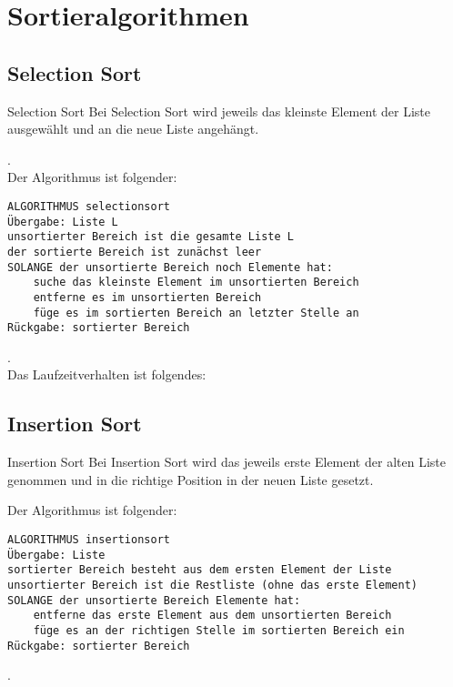 \section{Sortieralgorithmen}
\subsection{Selection Sort}
\begin{zitat}{Selection Sort}
Bei Selection Sort wird jeweils das kleinste Element der Liste ausgewählt und an die neue Liste angehängt.
\end{zitat}
.\\
Der Algorithmus ist folgender:
\begin{lstlisting}
ALGORITHMUS selectionsort
Übergabe: Liste L
unsortierter Bereich ist die gesamte Liste L
der sortierte Bereich ist zunächst leer
SOLANGE der unsortierte Bereich noch Elemente hat:
    suche das kleinste Element im unsortierten Bereich
    entferne es im unsortierten Bereich
    füge es im sortierten Bereich an letzter Stelle an
Rückgabe: sortierter Bereich
\end{lstlisting}
.\\
Das Laufzeitverhalten ist folgendes:
\begin{table}[h]
\label{tab:my-table}
\end{table}

\subsection{Insertion Sort}

\begin{zitat}{Insertion Sort}
Bei Insertion Sort wird das jeweils erste Element der alten Liste genommen und in die richtige Position in der neuen Liste gesetzt.
\end{zitat}
Der Algorithmus ist folgender:
\begin{lstlisting}
ALGORITHMUS insertionsort
Übergabe: Liste
sortierter Bereich besteht aus dem ersten Element der Liste
unsortierter Bereich ist die Restliste (ohne das erste Element)
SOLANGE der unsortierte Bereich Elemente hat:
    entferne das erste Element aus dem unsortierten Bereich
    füge es an der richtigen Stelle im sortierten Bereich ein
Rückgabe: sortierter Bereich
\end{lstlisting}
.\\

